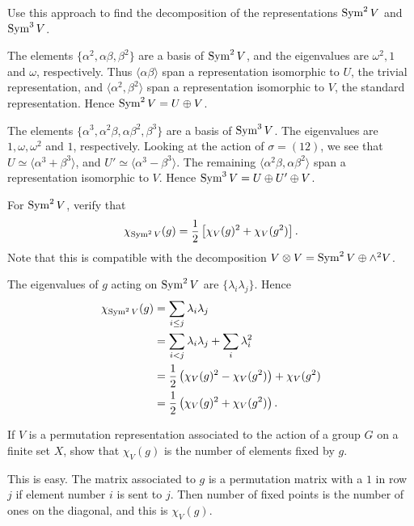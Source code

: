 \documentclass[11pt, english]{article}
\begin{document}
\begin{exc}[Exercise 1.11]
Use this approach to find the decomposition of the representations $\operatorname{Sym}^2 V$ and $\operatorname{Sym}^3 V$.
\end{exc}
\begin{sol}
The elements $\{ \alpha^2, \alpha \beta, \beta^2 \}$ are a basis of $\operatorname{Sym}^2 V$, and the eigenvalues are $\omega^2, 1$ and $\omega$, respectively. Thus $\langle \alpha \beta \rangle$ span a representation isomorphic to $U$, the trivial representation, and $\langle \alpha^2, \beta^2 \rangle$ span a representation isomorphic to $V$, the standard representation. Hence $\operatorname{Sym}^2 V = U \oplus V$.

The elements $\{ \alpha^3, \alpha^2 \beta, \alpha \beta^2, \beta^3 \}$ are a basis of $\operatorname{Sym}^3 V$. The eigenvalues are $1, \omega, \omega^2$ and $1$, respectively. Looking at the action of $\sigma=(12)$, we see that $U \simeq \langle \alpha^3+\beta^3 \rangle$, and $U' \simeq \langle \alpha^3-\beta^3 \rangle$. The remaining $\langle \alpha^2 \beta, \alpha \beta^2 \rangle$ span a representation isomorphic to $V$. Hence $\operatorname{Sym}^3 V = U \oplus U' \oplus V$.
\end{sol}

\begin{exc}[Exercise 2.2]
For $\operatorname{Sym}^2 V$, verify that
\[
\chi_{\operatorname{Sym}^2 V}(g) = \frac 12 \left[ \chi_V(g)^2 + \chi_V(g^2)\right].
\]
Note that this is compatible with the decomposition $V \otimes V = \operatorname{Sym}^2 V \oplus \wedge^2 V$.
\end{exc}
\begin{sol}

The eigenvalues of $g$ acting on $\operatorname{Sym}^2 V$ are $\{\lambda_i \lambda_j \}$. Hence
\begin{align*}
\chi_{\operatorname{Sym}^2 V}(g) &= \sum_{i \leq j} \lambda_i \lambda_j \\
&= \sum_{i < j} \lambda_i \lambda_j + \sum_i \lambda_i^2 \\
&= \frac 12 \left( \chi_V(g)^2 - \chi_V(g^2) \right) + \chi_V(g^2) \\
&= \frac 12  \left( \chi_V(g)^2 + \chi_V(g^2) \right).
\end{align*}
\end{sol}

\begin{exc}
If $V$ is a permutation representation associated to the action of a group $G$ on a finite set $X$, show that $\chi_V(g)$ is the number of elements fixed by $g$.
\end{exc}
\begin{sol}
This is easy. The matrix associated to $g$ is a permutation matrix with a $1$ in row $j$ if element number $i$ is sent to $j$. Then number of fixed points is the number of ones on the diagonal, and this is $\chi_V(g)$.
\end{sol}
\end{document}
